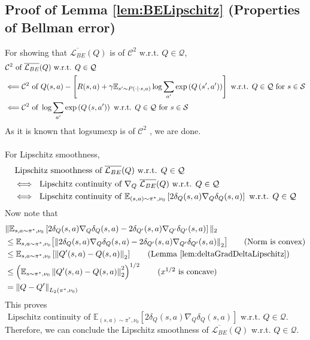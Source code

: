 \subsection{Proof of Lemma \ref{lem:BELipschitz} (Properties of Bellman error)}
For showing that $\overline{\mathcal{L}_{BE}}(Q)$ is of $\mathcal{C}^2 \text{ w.r.t. 
    } Q\in\mathcal{Q}$,
\begin{align}
    &\mathcal{C}^2 \text{ of } \overline{\mathcal{L}_{BE}}(Q) \text{ w.r.t. 
    } Q\in\mathcal{Q}\notag
    \\
    & \Longleftarrow \mathcal{C}^2 \text{ of } Q(s, a)-\left[R(s, a)+\gamma \mathbb{E}_{s^{\prime} \sim P(\cdot \mid \cdot s, a)} \log \sum_{a^{\prime}} \exp \left(Q\left(s^{\prime}, a^{\prime}\right)\right)\right] \text{ w.r.t. 
    } Q\in\mathcal{Q} \text{ for }s\in\mathcal{S}\notag
    \\
    &\Longleftarrow   \mathcal{C}^2 \text{ of }  \log \sum_{a^{\prime}} \exp \left(Q\left(s, a^{\prime}\right)\right) \text{ w.r.t. 
    } Q\in\mathcal{Q} \text{ for }s\in\mathcal{S}\notag
\end{align}
As it is known that logsumexp is of $\mathcal{C}^2$ \cite{kan2023lseminkmodifiednewtonkrylovmethod}, we are done. 
\;
\\
\;
\\
For Lipschitz smoothness, 
\begin{align}
    &\text{Lipschitz} \text{ smoothness } \text{of } \overline{\mathcal{L}_{BE}}(Q) \text{ w.r.t. 
    } Q\in\mathcal{Q}\notag
    \\
    &\!\!\iff \text{ Lipschitz continuity of } \nabla_Q \; \overline{\mathcal{L}_{BE}}(Q) \text{ w.r.t. 
    } Q\in\mathcal{Q} \notag
    \\
    &\!\!\iff \text{ Lipschitz continuity of } \mathbb{E}_{(s, a) \sim \pi^*, \nu_0}\left[2 \delta_Q(s, a) \nabla_Q \delta_Q(s, a)\right] \text{ w.r.t. 
    } Q\in\mathcal{Q} \notag
\end{align}
Now note that
\begin{align}
    &\|\mathbb{E}_{s,a \sim \pi^*, \nu_0}\left[2 \delta_Q(s, a) \nabla_Q \delta_Q(s, a)-2 \delta_{Q^\prime}(s, a) \nabla_{Q^\prime} \delta_{Q^\prime}(s, a)\right]\|_2 \notag 
    \\
    & \leq \mathbb{E}_{s,a \sim \pi^*, \nu_0}\bigl[\left\|2 \delta_Q(s, a) \nabla_Q \delta_Q(s, a)-2 \delta_{Q^\prime}(s, a) \nabla_{Q^\prime} \delta_{Q^\prime}(s, a)\right\|_2\bigr] \tag {Norm is convex}
  \\
  &\leq \mathbb{E}_{s,a \sim \pi^*, \nu_0}\left[\left\|Q^{\prime}(s,a)-Q(s, a)\right\|_2\right] \tag{Lemma \ref{lem:deltaGradDeltaLipschitz}}
  \\
  &\leq\left(\mathbb{E}_{s \sim \pi^*, \nu_0}\left\|Q^{\prime}(s, a)-Q(s, a)\right\|_2^2\right)^{1 / 2} \tag{$x^{1/2}$ is concave}
  \\
  &=\left\|Q-Q^{\prime}\right\|_{L_2(\pi^\ast, \nu_0)} \notag
\end{align}
This proves $ \text{ Lipschitz continuity of } \mathbb{E}_{(s, a) \sim \pi^*, \nu_0}\left[2 \delta_Q(s, a) \nabla_Q \delta_Q(s, a)\right] \text{ w.r.t. 
    } Q\in\mathcal{Q}$. Therefore, we can conclude the Lipschitz smoothness of $\overline{\mathcal{L}_{BE}}(Q)$ w.r.t. $ Q\in\mathcal{Q}$.
    \QED

